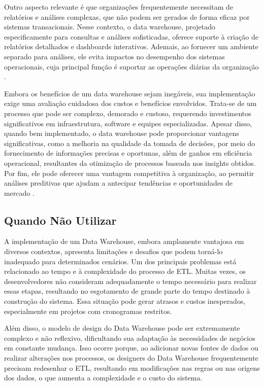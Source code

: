 Outro aspecto relevante é que organizações frequentemente necessitam de relatórios e análises complexas, que não podem ser gerados de forma 
eficaz por sistemas transacionais. Nesse contexto, o data warehouse, projetado especificamente para consultas e análises sofisticadas, oferece 
suporte à criação de relatórios detalhados e dashboards interativos. Ademais, ao fornecer um ambiente separado para análises, ele evita 
impactos no desempenho dos sistemas operacionais, cuja principal função é suportar as operações diárias da organização \cite{santoso2017data}.

Embora os benefícios de um data warehouse sejam inegáveis, sua implementação exige uma avaliação cuidadosa dos custos e benefícios envolvidos. 
Trata-se de um processo que pode ser complexo, demorado e custoso, requerendo investimentos significativos em infraestrutura, software e 
equipes especializadas. Apesar disso, quando bem implementado, o data warehouse pode proporcionar vantagens significativas, como a melhoria 
na qualidade da tomada de decisões, por meio do fornecimento de informações precisas e oportunas, além de ganhos em eficiência operacional, 
resultantes da otimização de processos baseada nos insights obtidos. Por fim, ele pode oferecer uma vantagem competitiva à organização, ao 
permitir análises preditivas que ajudam a antecipar tendências e oportunidades de mercado \cite{vaisman2014data, mousa2015data}.

\subsection{Quando Não Utilizar}
A implementação de um Data Warehouse, embora amplamente vantajosa em diversos contextos, apresenta limitações e desafios que podem torná-lo 
inadequado para determinados cenários. Um dos principais problemas está relacionado ao tempo e à complexidade do processo de ETL. Muitas vezes, 
os desenvolvedores não consideram adequadamente o tempo necessário para realizar essas etapas, resultando no esgotamento de grande parte do 
tempo destinado à construção do sistema. Essa situação pode gerar atrasos e custos inesperados, especialmente em projetos com cronogramas restritos.

Além disso, o modelo de design do Data Warehouse pode ser extremamente complexo e não reflexivo, dificultando sua adaptação às necessidades de 
negócios em constante mudança. Isso ocorre porque, ao adicionar novas fontes de dados ou realizar alterações nos processos, os designers do Data 
Warehouse frequentemente precisam redesenhar o ETL, resultando em modificações nas regras ou nas origens dos dados, o que aumenta a complexidade 
e o custo do sistema.

